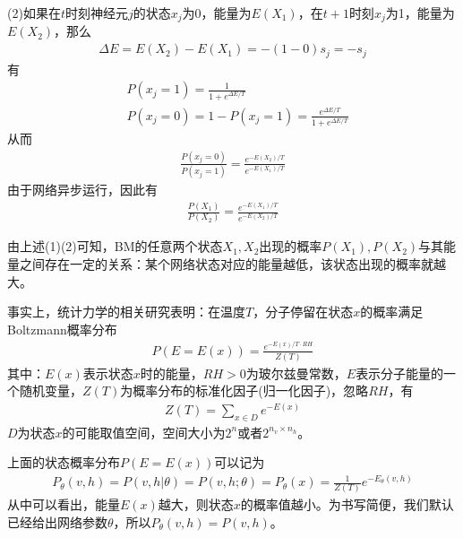             (2)如果在$t$时刻神经元$j$的状态$x_j$为0，能量为$E(X_1)$，在$t+1$时刻$x_j$为1，能量为$E(X_2)$，那么
            \begin{align*}
            \Delta E = E(X_2)  - E(X_1) = -(1-0)s_j = -s_j
            \end{align*}
            有
            \begin{align*}
            & P(x_j = 1)  = \frac{1}{1+e^{\Delta E/T}}\\
            & P(x_j = 0) = 1-P(x_j = 1)  = \frac{e^{\Delta E/T}}{1+e^{\Delta E/T}}
            \end{align*}
            从而
            \begin{align*}
            \frac{P(x_j = 0)}{P(x_j = 1)} = \frac{e^{- E(X_2)/T}}{e^{- E(X_1)/T}}
            \end{align*}
            由于网络异步运行，因此有
            \begin{align*}
            \frac{P(X_1)}{P(X_2)} = \frac{e^{- E(X_1)/T}}{e^{- E(X_2)/T}}
            \end{align*}
            \par
            由上述(1)(2)可知，BM的任意两个状态$X_1,X_2$出现的概率$P(X_1),P(X_2)$与其能量之间存在一定的关系：某个网络状态对应的能量越低，该状态出现的概率就越大。
            \par
            事实上，统计力学的相关研究表明：在温度$T$，分子停留在状态$x$的概率满足Boltzmann概率分布
            \begin{align*}
            P(E = E(x)) = \frac{e^{-E(x)/T\cdot RH}}{Z(T)}
            \end{align*}
            其中：$E(x)$表示状态$x$时的能量，$RH>0$为玻尔兹曼常数，$E$表示分子能量的一个随机变量，$Z(T)$为概率分布的标准化因子(归一化因子)，忽略$RH$，有
            \begin{align*}
            Z(T) = \sum_{x\in D} e^{-E(x)}
            \end{align*}
            $D$为状态$x$的可能取值空间，空间大小为$2^n$或者$2^{n_v\times n_h}$。
            \par
            上面的状态概率分布$P(E = E(x))$可以记为
            \begin{align*}
            P_\theta(v,h) = P(v,h|\theta) = P(v,h;\theta) = P_\theta(x) = \frac{1}{Z(T)}e^{-E_\theta(v,h)}
            \end{align*}
            从中可以看出，能量$E(x)$越大，则状态$x$的概率值越小。为书写简便，我们默认已经给出网络参数$\theta$，所以$P_\theta(v,h) = P(v,h)$。
